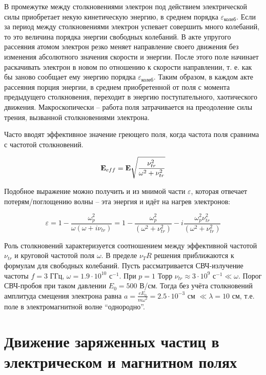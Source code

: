 \documentclass[10pt, a4paper]{article}
\let\stdsection\section
\renewcommand\section{\newpage\stdsection}
\begin{document}
В промежутке между столкновениями электрон под действием электрической силы приобретает некую кинетическую энергию, в среднем порядка $\varepsilon_\text{колеб}$. Если за период между столкновениями электрон успевает совершить много колебаний, то это величина порядка энергии свободных колебаний. В акте упругого рассеяния атомом электрон резко меняет направление своего движения без изменения абсолютного значения скорости и энергии. После этого поле начинает раскачивать электрон в новом по отношению к скорости направлении, т. е. как бы заново сообщает ему энергию порядка $\varepsilon_\text{колеб}$. Таким образом, в каждом акте рассеяния порция энергии, в среднем приобретенной от поля с момента предыдущего столкновения, переходит в энергию поступательного, хаотического движения. Макроскопически -- работа поля затрачивается на преодоление силы трения, вызванной столкновениями электрона.

Часто вводят эффективное значение греющего поля, когда частота поля сравнима с частотой столкновений.

\begin{equation*}
	\vb{E}_{eff} = \vb{E} \sqrt{\frac{\nu_{tr}^2}{\omega^2+\nu_{tr}^2}}
\end{equation*}

Подобное выражение можно получить и из мнимой части $\varepsilon$, которая отвечает потерям/поглощению волны -- эта энергия и идёт на нагрев электронов:

\begin{equation*}
	\varepsilon=1-\frac{\omega_p^2} {\omega (\omega+i\nu_{tr})} = 1-\frac{\omega_p^2}{(\omega^2 + \nu_{tr}^2)}-i \frac{\omega_p^2 \nu^2_{tr}}{(\omega^2 + \nu_{tr}^2)}
\end{equation*}

Роль столкновений характеризуется соотношением между эффективной частотой $\nu_{tr}$ и круговой частотой поля $\omega$. В пределе $\nu_TR$ решения приближаются к формулам для свободных колебаний. Пусть рассматривается СВЧ-излучение частоты $f = 3$ ГГц, $\omega = 1.9\cdot10^{10}$ с$^{-1}$. При $p = 1$ Торр $\nu_{tr} \approx 3\cdot10^9$ с$^{-1} \ll \omega$. Порог СВЧ-пробоя при таком давлении $E_0 = 500$ В/см. Тогда без учёта столкновений амплитуда смещения электрона равна $a = \frac{eE_0}{m\omega^2} = 2.5\cdot10^{-3}$ см $\ll \lambda = 10$ см, т.е. поле в электромагнитной волне ``однородно''.

\section{Движение заряженных частиц в электрическом и магнитном полях}
\end{document}
